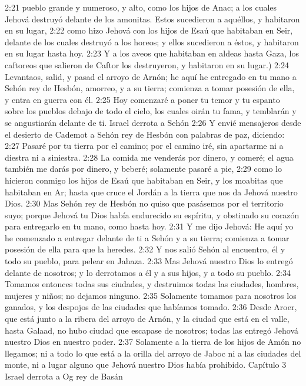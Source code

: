 2:21 pueblo grande y numeroso, y alto, como los hijos de Anac; a los cuales Jehová destruyó delante de los amonitas. Estos sucedieron a aquéllos, y habitaron en su lugar,  
2:22 como hizo Jehová con los hijos de Esaú que habitaban en Seir, delante de los cuales destruyó a los horeos; y ellos sucedieron a éstos, y habitaron en su lugar hasta hoy.  
2:23 Y a los aveos que habitaban en aldeas hasta Gaza, los caftoreos que salieron de Caftor los destruyeron, y habitaron en su lugar.)  
2:24 Levantaos, salid, y pasad el arroyo de Arnón; he aquí he entregado en tu mano a Sehón rey de Hesbón, amorreo, y a su tierra; comienza a tomar posesión de ella, y entra en guerra con él.  
2:25 Hoy comenzaré a poner tu temor y tu espanto sobre los pueblos debajo de todo el cielo, los cuales oirán tu fama, y temblarán y se angustiarán delante de ti.  
Israel derrota a Sehón   
2:26 Y envié mensajeros desde el desierto de Cademot a Sehón rey de Hesbón con palabras de paz, diciendo:  
2:27 Pasaré por tu tierra por el camino; por el camino iré, sin apartarme ni a diestra ni a siniestra.  
2:28 La comida me venderás por dinero, y comeré; el agua también me darás por dinero, y beberé; solamente pasaré a pie,  
2:29 como lo hicieron conmigo los hijos de Esaú que habitaban en Seir, y los moabitas que habitaban en Ar; hasta que cruce el Jordán a la tierra que nos da Jehová nuestro Dios.  
2:30 Mas Sehón rey de Hesbón no quiso que pasásemos por el territorio suyo; porque Jehová tu Dios había endurecido su espíritu, y obstinado su corazón para entregarlo en tu mano, como hasta hoy.  
2:31 Y me dijo Jehová: He aquí yo he comenzado a entregar delante de ti a Sehón y a su tierra; comienza a tomar posesión de ella para que la heredes.  
2:32 Y nos salió Sehón al encuentro, él y todo su pueblo, para pelear en Jahaza.  
2:33 Mas Jehová nuestro Dios lo entregó delante de nosotros; y lo derrotamos a él y a sus hijos, y a todo su pueblo.  
2:34 Tomamos entonces todas sus ciudades, y destruimos todas las ciudades, hombres, mujeres y niños; no dejamos ninguno.  
2:35 Solamente tomamos para nosotros los ganados, y los despojos de las ciudades que habíamos tomado.  
2:36 Desde Aroer, que está junto a la ribera del arroyo de Arnón, y la ciudad que está en el valle, hasta Galaad, no hubo ciudad que escapase de nosotros; todas las entregó Jehová nuestro Dios en nuestro poder.  
2:37 Solamente a la tierra de los hijos de Amón no llegamos; ni a todo lo que está a la orilla del arroyo de Jaboc ni a las ciudades del monte, ni a lugar alguno que Jehová nuestro Dios había prohibido.  
Capítulo 3
Israel derrota a Og rey de Basán  
 
